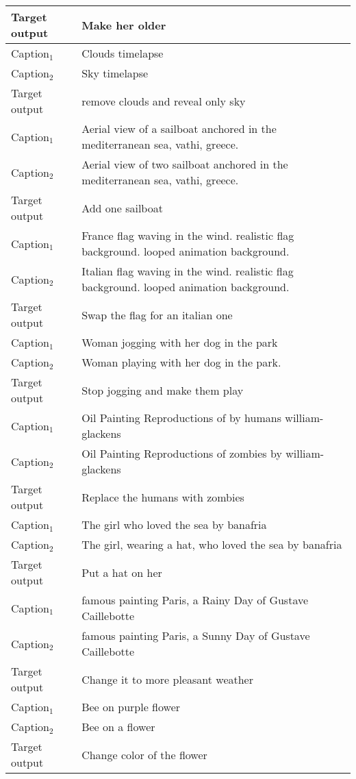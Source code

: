 \begin{table}
\begin{tabular}{ll}
Target output & Make her older \\
\midrule
Caption$_1$ & Clouds timelapse \\
Caption$_2$ & Sky timelapse \\
Target output & remove clouds and reveal only sky \\
\midrule
Caption$_1$ & Aerial view of a sailboat anchored in the mediterranean sea, vathi, greece. \\
Caption$_2$ & Aerial view of two sailboat anchored in the mediterranean sea, vathi, greece. \\
Target output & Add one sailboat \\
\midrule
Caption$_1$ & France flag waving in the wind. realistic flag background. looped animation background. \\
Caption$_2$ & Italian flag waving in the wind. realistic flag background. looped animation background. \\
Target output & Swap the flag for an italian one \\
\midrule
Caption$_1$ & Woman jogging with her dog in the park \\
Caption$_2$ & Woman playing with her dog in the park. \\
Target output & Stop jogging and make them play \\
\midrule
Caption$_1$ & Oil Painting Reproductions of by humans william-glackens \\
Caption$_2$ & Oil Painting Reproductions of zombies by william-glackens \\
Target output & Replace the humans with zombies \\
\midrule
Caption$_1$ & The girl who loved the sea by banafria \\
Caption$_2$ & The girl, wearing a hat, who loved the sea by banafria \\
Target output & Put a hat on her \\
\midrule
Caption$_1$ & famous painting Paris, a Rainy Day of Gustave Caillebotte \\
Caption$_2$ & famous painting Paris, a Sunny Day of Gustave Caillebotte \\
Target output & Change it to more pleasant weather \\
\midrule
Caption$_1$ & Bee on purple flower \\
Caption$_2$ & Bee on a flower \\
Target output & Change color of the flower \\
    \bottomrule
\end{tabular}
\label{tab:added-examplges-mtg-llm}
\end{table}



